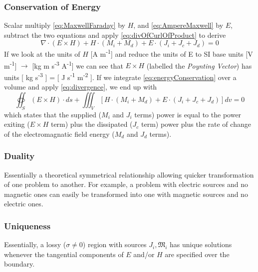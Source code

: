 \documentclass{article}
\numberwithin{equation}{section}
\begin{document}
        \subsubsection{Conservation of Energy}
            Scalar multiply \eqref{eq:MaxwellFaraday} by $H$, and
            \eqref{eq:AmpereMaxwell} by $E$, subtract the two equations and apply
            \eqref{eq:divOfCurlOfProduct} to derive
            \begin{equation} \label{eq:energyConservation}
                \nabla \cdot ( E \times H) + H \cdot ( M_i + M_d ) + E \cdot ( J_i + J_c
                + J_d ) = 0
            \end{equation}
            If we look at the units of $H$ [A m\textsuperscript{-1}] and reduce the
            units of E to SI base units [V m\textsuperscript{-1}] $\to$ [kg m
            s\textsuperscript{-3} A\textsuperscript{-1}] we can see that $E \times H$
            (labelled the \emph{Poynting Vector}) has units [ kg s\textsuperscript{-3} ]
            = [ J s\textsuperscript{-1} m\textsuperscript{-2} ]. If we integrate
            \eqref{eq:energyConservation} over a volume and apply \eqref{eq:divergence},
            we end up with
            \begin{equation} \label{eq:energyConservationIntegral}
                \oiint_S ( E \times H) \cdot ds + \iiint_V [ H \cdot ( M_i + M_d ) + E
                \cdot ( J_i + J_c + J_d )] dv = 0
            \end{equation}
            which states that the supplied ($M_i$ and $J_i$ terms) power is equal to the
            power exiting ($E \times H$ term) plus the dissipated ($J_c$ term) power
            plus the rate of change of the electromagnatic field energy ($M_d$ and $J_d$
            terms).
        \subsubsection{Duality}
            Essentially a theoretical symmetrical relationship allowing quicker
            transformation of one problem to another. For example, a problem with
            electric sources and no magnetic ones can easily be transformed into one
            with magnetic sources and no electric ones.
        \subsubsection{Uniqueness}
            Essentially, a lossy ($\sigma \neq 0$) region with sources $J_i,
            \mathfrak{M}_i$ has unique solutions whenever the tangential components of
            $E$ and/or $H$ are specified over the boundary.
\end{document}
